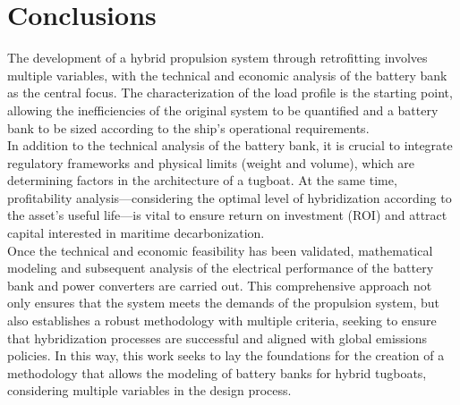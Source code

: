 \chapter{Conclusions}

The development of a hybrid propulsion system through retrofitting involves multiple variables, with the technical and economic analysis of the battery bank as the central focus. The characterization of the load profile is the starting point, allowing the inefficiencies of the original system to be quantified and a battery bank to be sized according to the ship's operational requirements.\\
In addition to the technical analysis of the battery bank, it is crucial to integrate regulatory frameworks and physical limits (weight and volume), which are determining factors in the architecture of a tugboat. At the same time, profitability analysis—considering the optimal level of hybridization according to the asset's useful life—is vital to ensure return on investment (ROI) and attract capital interested in maritime decarbonization.\\

Once the technical and economic feasibility has been validated, mathematical modeling and subsequent analysis of the electrical performance of the battery bank and power converters are carried out. This comprehensive approach not only ensures that the system meets the demands of the propulsion system, but also establishes a robust methodology with multiple criteria, seeking to ensure that hybridization processes are successful and aligned with global emissions policies. In this way, this work seeks to lay the foundations for the creation of a methodology that allows the modeling of battery banks for hybrid tugboats, considering multiple variables in the design process.

